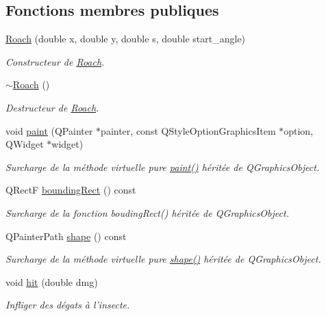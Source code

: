 \subsection*{Fonctions membres publiques}
\begin{DoxyCompactItemize}
\item 
\hyperlink{classRoach_af12999aec092cc5dc1afb0c3f85ee353}{Roach} (double x, double y, double s, double start\_\-angle)
\begin{DoxyCompactList}\small\item\em Constructeur de \hyperlink{classRoach}{Roach}. \end{DoxyCompactList}\item 
\hyperlink{classRoach_afc9000ffd6eb13d7280afbe0ef494f4f}{$\sim$Roach} ()
\begin{DoxyCompactList}\small\item\em Destructeur de \hyperlink{classRoach}{Roach}. \end{DoxyCompactList}\item 
void \hyperlink{classRoach_a13a922274476d77e17405cbe199ce691}{paint} (QPainter $\ast$painter, const QStyleOptionGraphicsItem $\ast$option, QWidget $\ast$widget)
\begin{DoxyCompactList}\small\item\em Surcharge de la méthode virtuelle pure \hyperlink{classRoach_a13a922274476d77e17405cbe199ce691}{paint()} héritée de QGraphicsObject. \end{DoxyCompactList}\item 
QRectF \hyperlink{classBug_a9b39c25361faad07b1bf2dd927d09dab}{boundingRect} () const 
\begin{DoxyCompactList}\small\item\em Surcharge de la fonction boudingRect() héritée de QGraphicsObject. \end{DoxyCompactList}\item 
QPainterPath \hyperlink{classBug_a587a36d3145c2b4dba6c689af22c65ac}{shape} () const 
\begin{DoxyCompactList}\small\item\em Surcharge de la méthode virtuelle pure \hyperlink{classBug_a587a36d3145c2b4dba6c689af22c65ac}{shape()} héritée de QGraphicsObject. \end{DoxyCompactList}\item 
void \hyperlink{classBug_a63402c05b5ba3fb034e41f1ced0e4b9f}{hit} (double dmg)
\begin{DoxyCompactList}\small\item\em Infliger des dégats à l'insecte. \end{DoxyCompactList}\item 

\end{DoxyCompactItemize}
